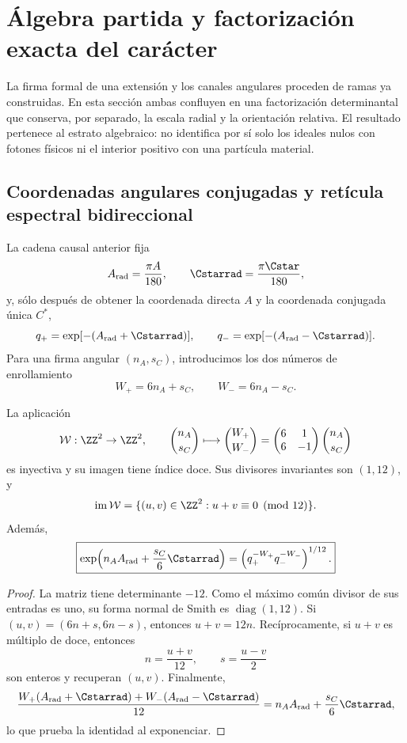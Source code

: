 \chapter{Álgebra partida y factorización exacta del carácter}
\label{chap:factorizacion-split}

La firma formal de una extensión y los canales angulares proceden de ramas
ya construidas. En esta sección ambas confluyen en una factorización
determinantal que conserva, por separado, la escala radial y la orientación
relativa. El resultado pertenece al estrato algebraico: no identifica por sí
solo los ideales nulos con fotones físicos ni el interior positivo con una
partícula material.

\section{Coordenadas angulares conjugadas y retícula espectral bidireccional}
\label{sec:reticula-angular-split}

La cadena causal anterior fija
\[
 A_{\rm rad}=\frac{\pi A}{180},\qquad
 \Cstarrad=\frac{\pi\Cstar}{180},
\]
y, sólo después de obtener la coordenada directa \(A\) y la coordenada
conjugada única \(C^*\),
\[
 q_+=\exp[-(A_{\rm rad}+\Cstarrad)],
 \qquad
 q_-=\exp[-(A_{\rm rad}-\Cstarrad)].
\]
Para una firma angular \((n_A,s_C)\), introducimos los dos números de
enrollamiento
\[
 W_+=6n_A+s_C,
 \qquad
 W_-=6n_A-s_C.
\]

\begin{theorem}
\label{thm:reticula-two-way}
La aplicación
\[
 \mathcal W:\ZZ^2\to\ZZ^2,
 \qquad
 \binom{n_A}{s_C}\longmapsto
 \binom{W_+}{W_-}
 =\begin{pmatrix}6&1\\6&-1\end{pmatrix}
 \binom{n_A}{s_C}
\]
es inyectiva y su imagen tiene índice doce. Sus divisores invariantes son
\((1,12)\), y
\[
 \operatorname{im}\mathcal W
 =\{(u,v)\in\ZZ^2:u+v\equiv0\pmod{12}\}.
\]
Además,
\[
 \boxed{
 \exp\!\left(n_AA_{\rm rad}+\frac{s_C}{6}\Cstarrad\right)
 =\left(q_+^{-W_+}q_-^{-W_-}\right)^{1/12}.}
\]
\end{theorem}

\begin{proof}
La matriz tiene determinante \(-12\). Como el máximo común divisor de sus
entradas es uno, su forma normal de Smith es
\(\operatorname{diag}(1,12)\). Si
\((u,v)=(6n+s,6n-s)\), entonces \(u+v=12n\). Recíprocamente, si
\(u+v\) es múltiplo de doce, entonces
\[
 n=\frac{u+v}{12},
 \qquad
 s=\frac{u-v}{2}
\]
son enteros y recuperan \((u,v)\). Finalmente,
\[
 \frac{W_+(A_{\rm rad}+\Cstarrad)
       +W_-(A_{\rm rad}-\Cstarrad)}{12}
 =n_AA_{\rm rad}+\frac{s_C}{6}\Cstarrad,
\]
lo que prueba la identidad al exponenciar.
\end{proof}

